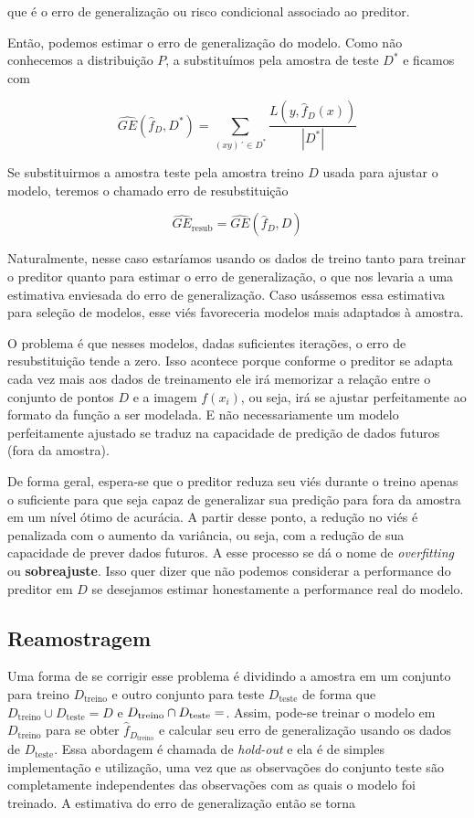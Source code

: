 \documentclass[
  12pt,
  oneside,
  a4paper,
  chapter=TITLE,
  section=TITLE,
  brazil]{abntex2}
\begin{document}
que é o erro de generalização ou risco condicional associado ao
preditor.

Então, podemos estimar o erro de generalização do modelo. Como não
conhecemos a distribuição \(P\), a substituímos pela amostra de teste
\(D^*\) e ficamos com

\[\widehat{GE}(\hat{f}_D, D^*) = \sum_{(xy)´ \in D^*} \frac{L(y, \hat{f}_D(x))}{|D^*|}\]

Se substituirmos a amostra teste pela amostra treino \(D\) usada para
ajustar o modelo, teremos o chamado erro de resubstituição

\[\widehat{GE}_\text{resub} = \widehat{GE}(\hat{f}_D, D)\]

Naturalmente, nesse caso estaríamos usando os dados de treino tanto para
treinar o preditor quanto para estimar o erro de generalização, o que
nos levaria a uma estimativa enviesada do erro de generalização. Caso
usássemos essa estimativa para seleção de modelos, esse viés favoreceria
modelos mais adaptados à amostra.

O problema é que nesses modelos, dadas suficientes iterações, o erro de
resubstituição tende a zero. Isso acontece porque conforme o preditor se
adapta cada vez mais aos dados de treinamento ele irá memorizar a
relação entre o conjunto de pontos \(D\) e a imagem \(f(x_i)\), ou seja,
irá se ajustar perfeitamente ao formato da função a ser modelada. E não
necessariamente um modelo perfeitamente ajustado se traduz na capacidade
de predição de dados futuros (fora da amostra).

De forma geral, espera-se que o preditor reduza seu viés durante o
treino apenas o suficiente para que seja capaz de generalizar sua
predição para fora da amostra em um nível ótimo de acurácia. A partir
desse ponto, a redução no viés é penalizada com o aumento da variância,
ou seja, com a redução de sua capacidade de prever dados futuros. A esse
processo se dá o nome de \emph{overfitting} ou \textbf{sobreajuste}.
Isso quer dizer que não podemos considerar a performance do preditor em
\(D\) se desejamos estimar honestamente a performance real do modelo.

\hypertarget{reamostragem}{%
\subsection{Reamostragem}\label{reamostragem}}

Uma forma de se corrigir esse problema é dividindo a amostra em um
conjunto para treino \(D_\text{treino}\) e outro conjunto para teste
\(D_\text{teste}\) de forma que
\(D_\text{treino} \cup D_\text{teste} = D\) e
\(D_\text{treino} \cap D_\text{teste} = \empty\). Assim, pode-se treinar
o modelo em \(D_\text{treino}\) para se obter
\(\hat{f}_{D_{\text{treino}}}\) e calcular seu erro de generalização
usando os dados de \(D_\text{teste}\). Essa abordagem é chamada de
\emph{hold-out} e ela é de simples implementação e utilização, uma vez
que as observações do conjunto teste são completamente independentes das
observações com as quais o modelo foi treinado. A estimativa do erro de
generalização então se torna
\end{document}

